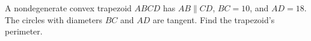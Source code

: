 A nondegenerate convex trapezoid $ABCD$ has $AB\parallel CD$, $BC=10$, and $AD=18$. The circles with diameters $BC$ and $AD$ are tangent. Find the trapezoid's perimeter.
